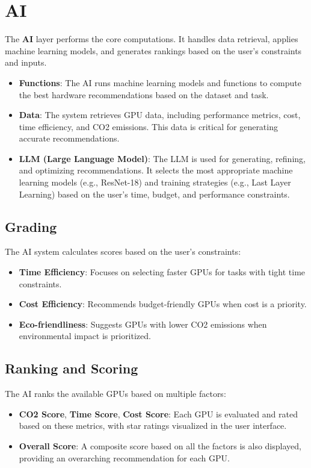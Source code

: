 \documentclass{report}
\begin{document}
\section{AI }
The \textbf{AI} layer performs the core computations. It handles data retrieval, applies machine learning models, and generates rankings based on the user’s constraints and inputs.

\begin{itemize}
    \item \textbf{Functions}: The AI runs machine learning models and functions to compute the best hardware recommendations based on the dataset and task.
    \item \textbf{Data}: The system retrieves GPU data, including performance metrics, cost, time efficiency, and CO2 emissions. This data is critical for generating accurate recommendations.
    \item \textbf{LLM (Large Language Model)}: The LLM is used for generating, refining, and optimizing recommendations. It selects the most appropriate machine learning models (e.g., ResNet-18) and training strategies (e.g., Last Layer Learning) based on the user’s time, budget, and performance constraints.
\end{itemize}

\subsection{Grading}
The AI system calculates scores based on the user's constraints:
\begin{itemize}
    \item \textbf{Time Efficiency}: Focuses on selecting faster GPUs for tasks with tight time constraints.
    \item \textbf{Cost Efficiency}: Recommends budget-friendly GPUs when cost is a priority.
    \item \textbf{Eco-friendliness}: Suggests GPUs with lower CO2 emissions when environmental impact is prioritized.
\end{itemize}

\subsection{Ranking and Scoring}
The AI ranks the available GPUs based on multiple factors:
\begin{itemize}
    \item \textbf{CO2 Score}, \textbf{Time Score}, \textbf{Cost Score}: Each GPU is evaluated and rated based on these metrics, with star ratings visualized in the user interface.
    \item \textbf{Overall Score}: A composite score based on all the factors is also displayed, providing an overarching recommendation for each GPU.
\end{itemize}
\end{document}
